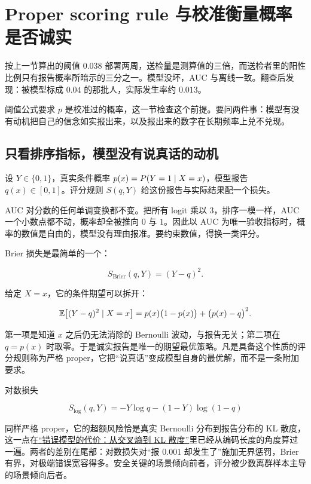 \section{Proper scoring rule 与校准衡量概率是否诚实}
\label{sec:11-Mathematical-Statistics/07-Statistical-Decision-and-Reliable-Prediction/04}

按上一节算出的阈值 \(0.038\) 部署两周，送检量是测算值的三倍，而送检者里的阳性比例只有报告概率所暗示的三分之一。模型没坏，AUC 与离线一致。翻查后发现：被模型标成 \(0.04\) 的那批人，实际发生率约 \(0.013\)。

阈值公式要求 \(p\) 是校准过的概率，这一节检查这个前提。要问两件事：模型有没有动机把自己的信念如实报出来，以及报出来的数字在长期频率上兑不兑现。

\subsection{只看排序指标，模型没有说真话的动机}

设 \(Y\in\{0,1\}\)，真实条件概率 \(p(x)=P(Y=1\mid X=x)\)，模型报告 \(q(x)\in[0,1]\)。评分规则 \(S(q,Y)\) 给这份报告与实际结果配一个损失。

AUC 对分数的任何单调变换都不变。把所有 logit 乘以 \(3\)，排序一模一样，AUC 一个小数点都不动，概率却全被推向 \(0\) 与 \(1\)。因此以 AUC 为唯一验收指标时，概率的数值是自由的，模型没有理由报准。要约束数值，得换一类评分。

Brier 损失是最简单的一个：

\[
S_{\mathrm{Brier}}(q,Y)=(Y-q)^2 .
\]

给定 \(X=x\)，它的条件期望可以拆开：

\[
\mathbb{E}\!\left[(Y-q)^2\mid X=x\right]=p(x)\bigl(1-p(x)\bigr)+\bigl(p(x)-q\bigr)^2 .
\]

第一项是知道 \(x\) 之后仍无法消除的 Bernoulli 波动，与报告无关；第二项在 \(q=p(x)\) 时取零。于是诚实报告是唯一的期望最优策略。凡是具备这个性质的评分规则称为严格 proper，它把``说真话''变成模型自身的最优解，而不是一条附加要求。

对数损失

\[
S_{\log}(q,Y)=-Y\log q-(1-Y)\log(1-q)
\]

同样严格 proper，它的超额风险恰是真实 Bernoulli 分布到报告分布的 KL 散度，这一点在\hyperref[sec:07-Information-Theory/03-Divergences/01]{``错误模型的代价：从交叉熵到 KL 散度''}里已经从编码长度的角度算过一遍。两者的差别在尾部：对数损失对``报 \(0.001\) 却发生了''施加无界惩罚，Brier 有界，对极端错误宽容得多。安全关键的场景倾向前者，评分被少数离群样本主导的场景倾向后者。

